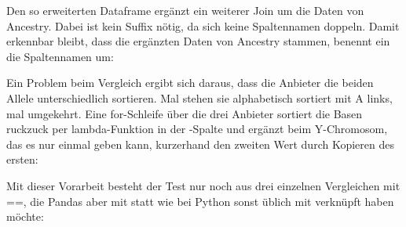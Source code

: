 Den so erweiterten Dataframe ergänzt ein weiterer Join um die Daten von Ancestry. Dabei ist kein Suffix nötig, da sich keine Spaltennamen doppeln. Damit erkennbar bleibt, dass die ergänzten Daten von Ancestry stammen, benennt ein  die Spaltennamen um:
	
\medskip







\PYTHON{\})}

\medskip


Ein Problem beim Vergleich ergibt sich daraus, dass die Anbieter die beiden Allele unterschiedlich sortieren. Mal stehen sie alphabetisch sortiert mit A links, mal umgekehrt. Eine for-Schleife über die drei Anbieter sortiert die Basen ruckzuck per lambda-Funktion in der -Spalte und ergänzt beim Y-Chromosom, das es nur einmal geben kann, kurzerhand den zweiten Wert durch Kopieren des ersten:

\medskip
	



\medskip


	Mit dieser Vorarbeit besteht der Test nur noch aus drei einzelnen Vergleichen mit ==, die Pandas aber mit \PYTHON{\&} statt wie bei Python sonst üblich mit  verknüpft haben möchte:
	
\medskip




